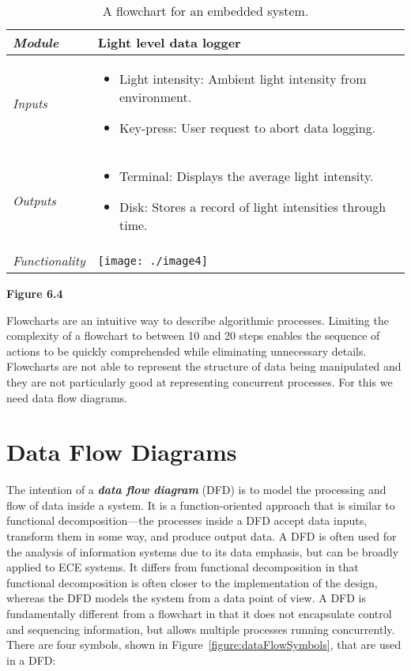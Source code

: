 \begin{table}
\caption{A flowchart for an embedded system.}
\label{table:flowchartEmbedded}
\begin{tabular}{|l|m{10cm}|}
\hline

\emph{Module} & Light level data logger \\ \hline
\emph{Inputs} & 
\begin{itemize}
\item
  Light intensity: Ambient light intensity from environment.
\item
  Key-press: User request to abort data logging.
\end{itemize}\\ \hline

\emph{Outputs} & 
\begin{itemize}
\item
  Terminal: Displays the average light intensity.
\item
  Disk: Stores a record of light intensities through time.
\end{itemize} \\ \hline
\emph{Functionality} &
\texttt{[image: ./image4]} \\ \hline
\end{tabular}
\end{table}

\textbf{Figure 6.4} 

Flowcharts are an intuitive way to describe algorithmic processes.
Limiting the complexity of a flowchart to between 10 and 20 steps
enables the sequence of actions to be quickly comprehended while
eliminating unnecessary details. Flowcharts are not able to represent
the structure of data being manipulated and they are not particularly
good at representing concurrent processes. For this we need data flow
diagrams.

\section{Data Flow Diagrams}
\label{section:data-flow-diagrams}

The intention of a \emph{\textbf{data flow diagram}} (DFD) is to model
the processing and flow of data inside a system. It is a
function-oriented approach that is similar to functional
decomposition---the processes inside a DFD accept data inputs, transform
them in some way, and produce output data. A DFD is often used for the
analysis of information systems due to its data emphasis, but can be
broadly applied to ECE systems. It differs from functional decomposition
in that functional decomposition is often closer to the implementation
of the design, whereas the DFD models the system from a data point of
view. A DFD is fundamentally different from a flowchart in that it does
not encapsulate control and sequencing information, but allows multiple
processes running concurrently. There are four symbols, shown in 
Figure~\ref{figure:dataFlowSymbols}, that are used in a DFD:

